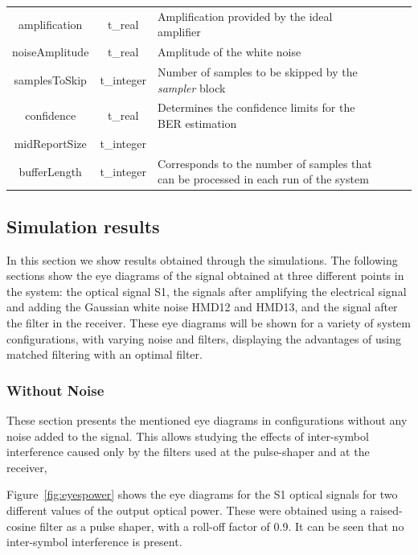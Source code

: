 \begin{refsection}
\begin{table}[H]
\begin{tabular}{|c|c|p{70mm}|ccp{70mm}}
		amplification & t\_real & Amplification provided by the ideal amplifier &    \\ \cline{1-3}
		noiseAmplitude & t\_real & Amplitude of the white noise &    \\ \cline{1-3}
		samplesToSkip & t\_integer & Number of samples to be skipped by the \textit{sampler} block &    \\ \cline{1-3}
		confidence & t\_real & Determines the confidence limits for the BER estimation &    \\ \cline{1-3}
		midReportSize & t\_integer &  &    \\ \cline{1-3}
		bufferLength & t\_integer & Corresponds to the number of samples that can be processed in each run of the system &    \\ \cline{1-3}
		\end{tabular}
		\label{table:in_par}
		\end{table}

\subsection*{Simulation results}

In this section we show results obtained through the simulations. The
following sections show the eye diagrams of the signal obtained at three
different points in the system: the optical signal S1, the signals after
amplifying the electrical signal and adding the Gaussian white noise HMD12 and
HMD13, and the signal after the filter in the receiver. These eye diagrams will
be shown for a variety of system configurations, with varying noise and
filters, displaying the advantages of using matched filtering with an optimal
filter.

\subsubsection{Without Noise}

These section presents the mentioned eye diagrams in configurations without any
noise added to the signal. This allows studying the effects of inter-symbol
interference caused only by the filters used at the pulse-shaper and at the
receiver,

Figure~\ref{fig:eyespower} shows the eye diagrams for the S1 optical signals
for two different values of the output optical power. These were obtained using
a
raised-cosine filter as a pulse shaper, with a roll-off factor of 0.9. It can
be seen that no inter-symbol interference is present.


\end{refsection}
